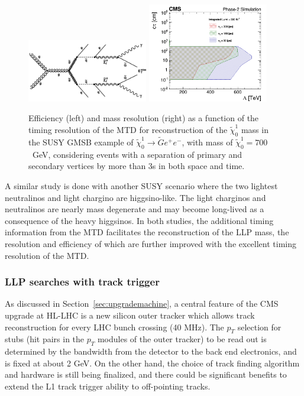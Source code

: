 \begin{figure}[hbtp]\begin{center}
\includegraphics[width=0.47\textwidth]{figures/MTD/diagram.png}
\includegraphics[width=0.47\textwidth]{figures/MTD/Limits_excl_2D_ComparingRes.png}
\caption{ 
Efficiency (left) and mass resolution (right) as a function of the timing resolution of the MTD for reconstruction of the $\tilde{\chi}_0^1$ mass in the SUSY GMSB example of $\tilde{\chi}_0^1 \to \tilde{G} e^{+} e^{-}$, with
mass of $\tilde{\chi}_0^1=700$~GeV, considering events with a separation of primary and secondary vertices by more than 3s in both space and time.
}
\label{fig:cmsupgrade_mtd}
\end{center}
\end{figure}

A similar study is done with another SUSY scenario where the two lightest neutralinos and light chargino are higgsino-like. The light charginos and neutralinos are nearly mass degenerate and
may become long-lived as a consequence of the heavy higgsinos. 
In both studies, the additional timing information from the MTD facilitates the reconstruction of the LLP mass, the resolution and efficiency of which are further improved with the excellent timing resolution of the MTD.


\subsubsection{LLP searches with track trigger}

As discussed in Section~\ref{sec:upgrademachine}, a central feature of the CMS upgrade at HL-LHC is a new silicon outer tracker which allows track reconstruction for every LHC bunch crossing (40 MHz). 
The $p_T$ selection for stubs (hit pairs in the $p_T$ modules of the outer tracker) to be read out is determined by the bandwidth from the detector 
to the back end electronics, and is fixed at about 2 GeV. 
On the other hand, the choice of track finding algorithm and hardware is still being finalized, and there could be significant benefits to extend the L1 track trigger ability to off-pointing tracks. 


